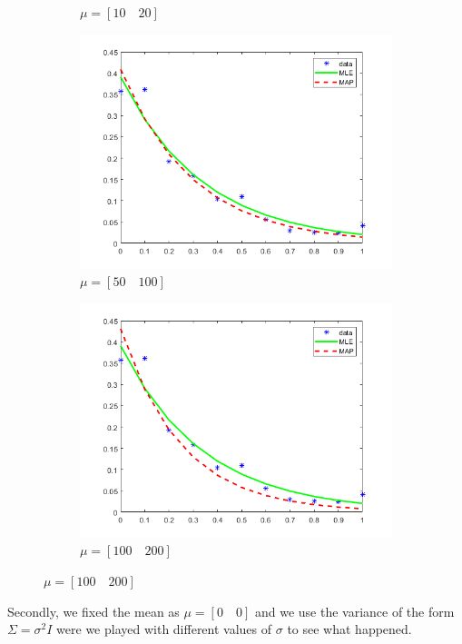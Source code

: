 \documentclass[11pt,a4paper]{article}
\begin{document}
\begin{enumerate}
\begin{itemize}
\begin{figure}[H]
\begin{subfigure}{0.4\textwidth}
			\caption{$ \mu  = [10\quad20]$}
		\label{fig4:first}
	\end{subfigure}
	\begin{subfigure}{0.4\textwidth}
		\includegraphics[width=\textwidth]{fig7}
		\caption{$ \mu  = [50\quad100]$}
		\label{fig4:first}
	\end{subfigure}
	\begin{subfigure}{0.4\textwidth}
		\includegraphics[width=\textwidth]{fig8}
			\caption{$ \mu  = [100\quad200]$}
		\label{fig4:first}
	\end{subfigure}
\end{figure}
Secondly, we fixed the mean as $ \mu =[0\quad 0] $ and we use the variance of the form $ \Sigma = \sigma^2 I $ were we played with different values of $ \sigma $ to see what happened.

\end{itemize}
\end{enumerate}
\end{document}
